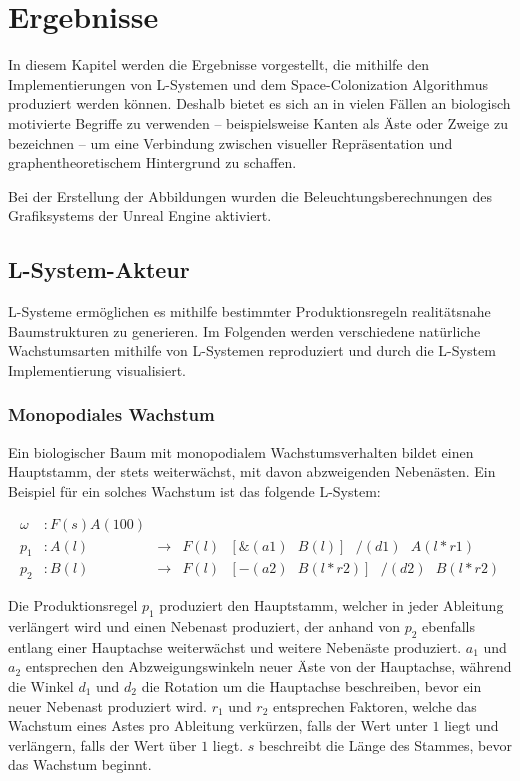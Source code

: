 \chapter{Ergebnisse}
In diesem Kapitel werden die Ergebnisse vorgestellt, die mithilfe den Implementierungen von L-Systemen und dem Space-Colonization Algorithmus produziert werden können. Deshalb bietet es sich an in vielen Fällen an biologisch motivierte Begriffe zu verwenden -- beispielsweise Kanten als Äste oder Zweige zu bezeichnen -- um eine Verbindung zwischen visueller Repräsentation und graphentheoretischem Hintergrund zu schaffen.

Bei der Erstellung der Abbildungen wurden die Beleuchtungsberechnungen des Grafiksystems der Unreal Engine aktiviert.
\section{L-System-Akteur}
L-Systeme ermöglichen es mithilfe bestimmter Produktionsregeln realitätsnahe Baumstrukturen zu generieren. Im Folgenden werden verschiedene natürliche Wachstumsarten mithilfe von L-Systemen reproduziert und durch die L-System Implementierung visualisiert.
\subsection{Monopodiales Wachstum}
Ein biologischer Baum mit monopodialem Wachstumsverhalten bildet einen Hauptstamm, der stets weiterwächst, mit davon abzweigenden Nebenästen. \cite[S.21]{Forstbonatik:17} Ein Beispiel für ein solches Wachstum ist das folgende L-System:

\begin{equation}
\begin{array}{llll}
\omega & : F(s)A(100) \\
p_1 & : A(l) &\rightarrow& F(l)\text{ }[\&(a1)\text{ }B(l)]\text{ }/(d1)\text{ }A(l*r1) \\
p_2 &  : B(l) &\rightarrow& F(l)\text{ }[-(a2)\text{ }B(l*r2)]\text{ }/(d2)\text{ }B(l*r2)
\end{array}
\label{eq:ProdMonopodial}
\end{equation} 
\cite[S.56]{ABOP:04}

Die Produktionsregel $p_1$ produziert den Hauptstamm, welcher in jeder Ableitung verlängert wird und einen Nebenast produziert, der anhand von $p_2$ ebenfalls entlang einer Hauptachse weiterwächst und weitere Nebenäste produziert. $a_1$ und $a_2$ entsprechen den Abzweigungswinkeln neuer Äste von der Hauptachse, während die Winkel $d_1$ und $d_2$ die Rotation um die Hauptachse beschreiben, bevor ein neuer Nebenast produziert wird. $r_1$ und $r_2$ entsprechen Faktoren, welche das Wachstum eines Astes pro Ableitung verkürzen, falls der Wert unter $1$ liegt und verlängern, falls der Wert über $1$ liegt. $s$ beschreibt die Länge des Stammes, bevor das Wachstum beginnt. \cite[S.57]{ABOP:04}

